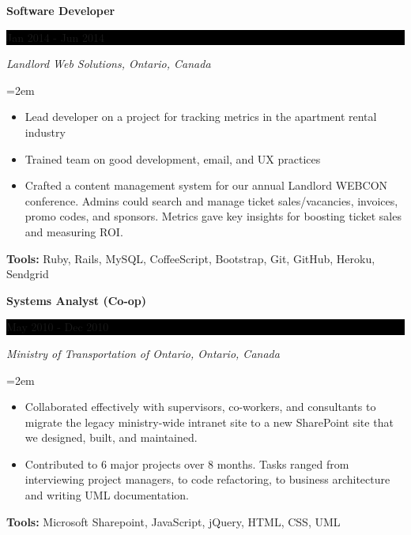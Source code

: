 \documentclass[paper=a4,fontsize=11pt]{scrartcl} %
\newcommand{\sepspace}{\vspace*{1em}}     %
\newcommand{\EducationEntry}[4]{
    \noindent \textbf{#1} \hfill        %
    \colorbox{Black}{
      \parbox{8.5em}{
      \hfill\color{White}#2}} \par      %
    \noindent \textit{#3} \par          %
    \noindent\hangindent=2em\hangafter=0 \small #4 %
    \normalsize \par}
\newcommand{\WorkEntry}[4]{             %
    \noindent \textbf{#1} \hfill        %
    \colorbox{Black}{%
      \parbox{9em}{%
      \hfill\color{White}#2}} \par      %
        \noindent \textit{#3} \par      %
    \noindent\hangindent=2em\hangafter=0 \small #4 %
    \normalsize \par}
\begin{document}
\WorkEntry{Software Developer}{Jan 2014 - Jun 2014}
{Landlord Web Solutions, Ontario, Canada}
{
 \begin{itemize} \itemsep -1pt
   \item Lead developer on a project for tracking metrics in the apartment rental industry
   \item Trained team on good development, email, and UX practices
   \item Crafted a content management system for our annual Landlord WEBCON conference.
         Admins could search and manage ticket sales/vacancies, invoices, promo codes, and sponsors.
         Metrics gave key insights for boosting ticket sales and measuring ROI.
 \end{itemize}
 \textbf{Tools:} Ruby, Rails, MySQL, CoffeeScript, Bootstrap, Git, GitHub, Heroku, Sendgrid
}
\sepspace

\WorkEntry{Systems Analyst (Co-op)}{May 2010 - Dec 2010}
{Ministry of Transportation of Ontario, Ontario, Canada}
{
 \begin{itemize} \itemsep -1pt
   \item Collaborated effectively with supervisors, co-workers, and consultants
         to migrate the legacy ministry-wide intranet site to a new
         SharePoint site that we designed, built, and maintained.
   \item Contributed to 6 major projects over 8 months.
         Tasks ranged from interviewing project managers, to code refactoring,
         to business architecture and writing UML documentation.
 \end{itemize}
 \textbf{Tools:} Microsoft Sharepoint, JavaScript, jQuery, HTML, CSS, UML
} %
\sepspace
\end{document}

